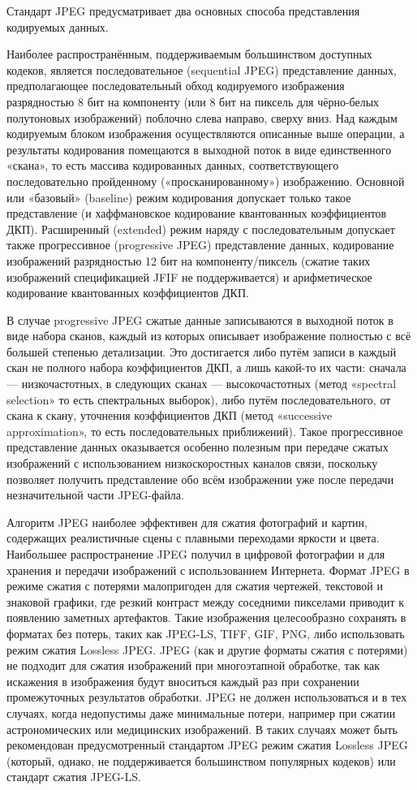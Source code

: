Стандарт JPEG предусматривает два основных способа представления кодируемых данных.

Наиболее распространённым, поддерживаемым большинством доступных кодеков, является последовательное (sequential JPEG) представление данных, предполагающее последовательный обход кодируемого изображения разрядностью 8 бит на компоненту (или 8 бит на пиксель для чёрно-белых полутоновых изображений) поблочно слева направо, сверху вниз. Над каждым кодируемым блоком изображения осуществляются описанные выше операции, а результаты кодирования помещаются в выходной поток в виде единственного «скана», то есть массива кодированных данных, соответствующего последовательно пройденному («просканированному») изображению. Основной или «базовый» (baseline) режим кодирования допускает только такое представление (и хаффмановское кодирование квантованных коэффициентов ДКП). Расширенный (extended) режим наряду с последовательным допускает также прогрессивное (progressive JPEG) представление данных, кодирование изображений разрядностью 12 бит на компоненту/пиксель (сжатие таких изображений спецификацией JFIF не поддерживается) и арифметическое кодирование квантованных коэффициентов ДКП.

В случае progressive JPEG сжатые данные записываются в выходной поток в виде набора сканов, каждый из которых описывает изображение полностью с всё большей степенью детализации. Это достигается либо путём записи в каждый скан не полного набора коэффициентов ДКП, а лишь какой-то их части: сначала — низкочастотных, в следующих сканах — высокочастотных (метод «spectral selection» то есть спектральных выборок), либо путём последовательного, от скана к скану, уточнения коэффициентов ДКП (метод «successive approximation», то есть последовательных приближений). Такое прогрессивное представление данных оказывается особенно полезным при передаче сжатых изображений с использованием низкоскоростных каналов связи, поскольку позволяет получить представление обо всём изображении уже после передачи незначительной части JPEG-файла.

Алгоритм JPEG наиболее эффективен для сжатия фотографий и картин, содержащих реалистичные сцены с плавными переходами яркости и цвета. Наибольшее распространение JPEG получил в цифровой фотографии и для хранения и передачи изображений с использованием Интернета.
Формат JPEG в режиме сжатия с потерями малопригоден для сжатия чертежей, текстовой и знаковой графики, где резкий контраст между соседними пикселами приводит к появлению заметных артефактов. Такие изображения целесообразно сохранять в форматах без потерь, таких как JPEG-LS, TIFF, GIF, PNG, либо использовать режим сжатия Lossless JPEG.
JPEG (как и другие форматы сжатия с потерями) не подходит для сжатия изображений при многоэтапной обработке, так как искажения в изображения будут вноситься каждый раз при сохранении промежуточных результатов обработки.
JPEG не должен использоваться и в тех случаях, когда недопустимы даже минимальные потери, например при сжатии астрономических или медицинских изображений. В таких случаях может быть рекомендован предусмотренный стандартом JPEG режим сжатия Lossless JPEG (который, однако, не поддерживается большинством популярных кодеков) или стандарт сжатия JPEG-LS.
